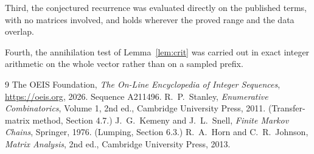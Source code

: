 \documentclass[11pt,a4paper]{article}
\theoremstyle{plain}
\theoremstyle{definition}
\begin{document}
Third, the conjectured recurrence was evaluated directly on the published terms, with no
matrices involved, and holds wherever the proved range and the data overlap.

Fourth, the annihilation test of Lemma~\ref{lem:crit} was carried out in exact integer
arithmetic on the whole vector rather than on a sampled prefix.

\begin{thebibliography}{9}
 The OEIS Foundation, \emph{The On-Line Encyclopedia of Integer
Sequences}, \url{https://oeis.org}, 2026. Sequence A211496.
 R.~P.~Stanley, \emph{Enumerative Combinatorics}, Volume 1, 2nd ed.,
Cambridge University Press, 2011. (Transfer-matrix method, Section 4.7.)
 J.~G.~Kemeny and J.~L.~Snell, \emph{Finite Markov Chains}, Springer, 1976.
(Lumping, Section 6.3.)
 R.~A.~Horn and C.~R.~Johnson, \emph{Matrix Analysis}, 2nd ed., Cambridge
University Press, 2013.
\end{thebibliography}
\end{document}
